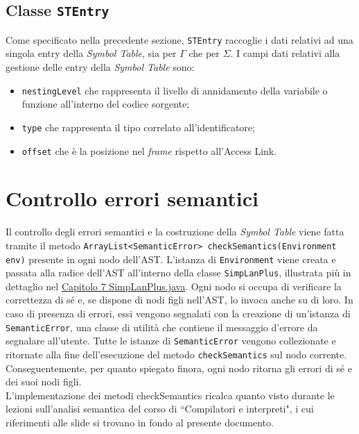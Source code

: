 \documentclass[../report.tex]{subfiles}
\begin{document}
\subsection[Classe STEntry]{Classe \texttt{STEntry}}
Come specificato nella precedente sezione, \verb|STEntry| raccoglie i dati relativi ad una singola entry della \textit{Symbol Table}, sia per $\Gamma{}$ che per $\Sigma{}$.
I campi dati relativi alla gestione delle entry della \textit{Symbol Table} sono:
\begin{itemize}
    \item \verb|nestingLevel| che rappresenta il livello di annidamento della variabile o funzione all'interno del codice sorgente;
    \item \verb|type| che rappresenta il tipo correlato all'identificatore;
    \item \verb|offset| che è la posizione nel \textit{frame} rispetto all'Access Link.
\end{itemize}

\section{Controllo errori semantici}
Il controllo degli errori semantici e la costruzione della \textit{Symbol Table} viene fatta tramite il metodo \verb|ArrayList<SemanticError> checkSemantics(Environment env)| presente in ogni nodo dell'AST.
L'istanza di \verb|Environment| viene creata e passata alla radice dell'AST all'interno della classe \verb|SimpLanPlus|, illustrata più in dettaglio nel \hyperref[c:simplanplus-java]{Capitolo 7 SimpLanPlus.java}.
Ogni nodo si occupa di verificare la correttezza di sé e, se dispone di nodi figli nell'AST, lo invoca anche su di loro.
In caso di presenza di errori, essi vengono segnalati con la creazione di un'istanza di \verb|SemanticError|, una classe di utilità che contiene il messaggio d'errore da segnalare all'utente.
Tutte le istanze di \verb|SemanticError| vengono collezionate e ritornate alla fine dell'esecuzione del metodo \verb|checkSemantics| sul nodo corrente.
Conseguentemente, per quanto spiegato finora, ogni nodo ritorna gli errori di sé e dei suoi nodi figli.\\
\noindent
L'implementazione dei metodi checkSemantics ricalca quanto visto durante le lezioni sull'analisi semantica del corso di ``Compilatori e interpreti", i cui riferimenti alle slide si trovano in fondo al presente documento.
\end{document}
